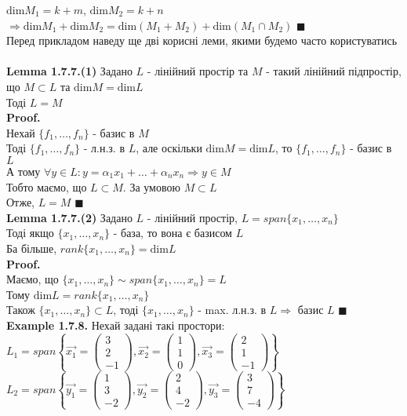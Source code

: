 \documentclass[a4paper, 14pt]{extarticle}
\def\ex#1{\textbf{Example {#1}}}
\def\lm#1{\textbf{Lemma {#1}}}
\def\proof{\textbf{Proof.}\\}
\def\bigline{\vspace{5mm}\\}
\def\qed{$\blacksquare$}
\def\dim#1{\textrm{dim} {#1}}
\begin{document}
	$\dim{M_1} = k + m$, \hspace{1cm}  $\dim{M_2} = k + n$\\
	$\Rightarrow \dim{M_1} + \dim{M_2} = \dim{(M_1+M_2)} + \dim{(M_1 \cap M_2)}$ \qed
	\bigline
	Перед прикладом наведу ще дві корисні леми, якими будемо часто користуватись\\
	\\
	\lm{1.7.7.(1)} Задано $L$ - лінійний простір та $M$ - такий лінійний підпростір, що $M \subset L$ та $\dim M = \dim L$\\
	Тоді $L=M$\\
	\proof
	Нехай $\{f_1,\dots,f_n\}$ - базис в $M$\\
	Тоді $\{f_1,\dots,f_n\}$ - л.н.з. в $L$, але оскільки $\dim M = \dim L$, то $\{f_1,\dots,f_n\}$ - базис в $L$\\
	А тому $\forall y \in L: y = \alpha_1 x_1 + \dots + \alpha_n x_n \Rightarrow y \in M$\\
	Тобто маємо, що $L \subset M$. За умовою $M \subset L$\\
	Отже, $L=M$ \qed
	\bigline
	\lm{1.7.7.(2)} Задано $L$ - лінійний простір, $L = span\{x_1,\dots,x_n\}$\\
	Тоді якщо $\{x_1,\dots,x_n\}$ - база, то вона є базисом $L$\\
	Ба більше, $rank\{x_1,\dots,x_n\} = \dim L$\\
	\proof
	Маємо, що $\{x_1,\dots,x_n\} \sim span\{x_1,\dots,x_n\} = L$\\
	Тому $\dim L = rank\{x_1,\dots,x_n\}$\\
	Також $\{x_1,\dots,x_n\} \subset L$, тоді $\{x_1,\dots,x_n\}$ - max. л.н.з. в $L \Rightarrow$ базис $L$ \qed
	\bigline
	\ex{1.7.8.} Нехай задані такі простори: \\ 
	$L_1 = span\left\{ \vec{x_1} = \begin{pmatrix} 3 \\ 2 \\ -1 \end{pmatrix}, \vec{x_2} = \begin{pmatrix} 1 \\ 1 \\ 0 \end{pmatrix}, \vec{x_3} = \begin{pmatrix} 2 \\ 1 \\ -1 \end{pmatrix}	 \right\}$\\
	$L_2 = span\left\{ \vec{y_1} = \begin{pmatrix} 1 \\ 3 \\ -2 \end{pmatrix}, \vec{y_2} = \begin{pmatrix} 2 \\ 4 \\ -2 \end{pmatrix}, \vec{y_3} = \begin{pmatrix} 3 \\ 7 \\ -4 \end{pmatrix}	 \right\}$\\
\end{document}
